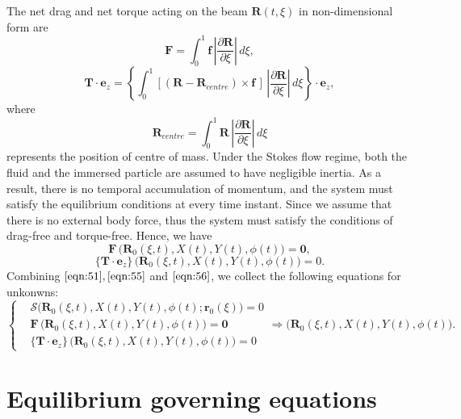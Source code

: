 \documentclass[a4paper,12pt]{report}
\begin{document}
The net drag and net torque acting on the beam $\textbf{R}(t,\xi)$ in non-dimensional form are 
\begin{equation}
	\label{eqn:52}
	\textbf{F}=\int^1_0 \textbf{f}\, \left|\frac{\partial\textbf{R}}{\partial\xi}\right|\,d\xi, 
\end{equation}
\begin{equation}
	\label{eqn:53}
	\mathbf{T}\cdot\textbf{e}_z=\left\{\int^1_0 \left[(\textbf{R}-\textbf{R}_{centre})\times \textbf{f}\,\right]\,\left|\frac{\partial\textbf{R}}{\partial\xi}\right|\,d\xi\right\}\cdot\textbf{e}_z,
\end{equation}
where 
\begin{equation}
	\label{eqn:54}
	\textbf{R}_{centre}=\int^1_0 \textbf{R}\,\left|\frac{\partial\textbf{R}}{\partial\xi}\right|\,d\xi
\end{equation}
represents the position of centre of mass. Under the Stokes flow regime, both the fluid and the immersed particle are assumed to have negligible inertia. As a result, there is no temporal accumulation of momentum, and the system must satisfy the equilibrium conditions at every time instant. Since we assume that there is no external body force, thus the system must satisfy the conditions of drag-free and torque-free. Hence, we have 
\begin{equation}
	\label{eqn:55}
	\textbf{F}\,\Big(\textbf{R}_0(\xi,t), X(t), Y(t), \phi(t)\Big)=\textbf{0},
\end{equation}
\begin{equation}
	\label{eqn:56}
	\{\mathbf{T}\cdot\textbf{e}_z\}\,\Big(\textbf{R}_0(\xi,t), X(t), Y(t), \phi(t)\Big)=0.
\end{equation} 
Combining $\eqref{eqn:51}, \eqref{eqn:55}$ and $\eqref{eqn:56}$, we collect the following equations for unkonwns:
\begin{equation}
	\label{eqn:57}
	\left\{\begin{aligned}
		&\bm{\mathcal{S}}\Big(\textbf{R}_0(\xi,t), X(t), Y(t),\phi(t);\textbf{r}_0(\xi)\Big)=0\\
		&\textbf{F}\,\Big(\textbf{R}_0(\xi,t), X(t), Y(t),\phi(t)\Big)=\textbf{0}\\
		&\{\mathbf{T}\cdot\textbf{e}_z\}\,\Big(\textbf{R}_0(\xi,t), X(t), Y(t),\phi(t)\Big)=0
	\end{aligned}\right.\Longrightarrow \Big(\textbf{R}_0(\xi,t), X(t), Y(t),\phi(t)\Big).
\end{equation}

\section{Equilibrium governing equations}
\end{document}
